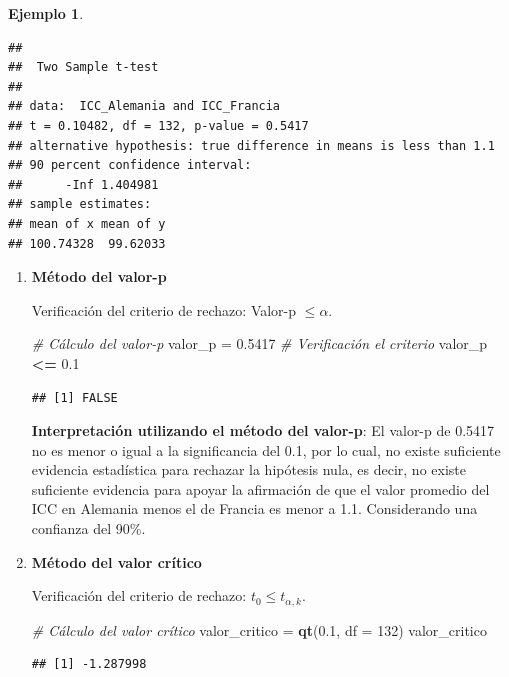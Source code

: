 \documentclass[
  11pt,
]{book}
\newenvironment{Shaded}{\begin{snugshade}}{\end{snugshade}}
\newcommand{\AttributeTok}[1]{\textcolor[rgb]{0.13,0.29,0.53}{#1}}
\newcommand{\CommentTok}[1]{\textcolor[rgb]{0.56,0.35,0.01}{\textit{#1}}}
\newcommand{\DecValTok}[1]{\textcolor[rgb]{0.00,0.00,0.81}{#1}}
\newcommand{\FloatTok}[1]{\textcolor[rgb]{0.00,0.00,0.81}{#1}}
\newcommand{\FunctionTok}[1]{\textcolor[rgb]{0.13,0.29,0.53}{\textbf{#1}}}
\newcommand{\NormalTok}[1]{#1}
\newcommand{\OtherTok}[1]{\textcolor[rgb]{0.56,0.35,0.01}{#1}}
\newcommand{\SpecialCharTok}[1]{\textcolor[rgb]{0.81,0.36,0.00}{\textbf{#1}}}
\theoremstyle{definition}
\theoremstyle{definition}
\newtheorem{example}{Ejemplo}[chapter]
\theoremstyle{definition}
\theoremstyle{definition}
\theoremstyle{remark}
\begin{document}
\begin{example}
\begin{verbatim}
## 
##  Two Sample t-test
## 
## data:  ICC_Alemania and ICC_Francia
## t = 0.10482, df = 132, p-value = 0.5417
## alternative hypothesis: true difference in means is less than 1.1
## 90 percent confidence interval:
##      -Inf 1.404981
## sample estimates:
## mean of x mean of y 
## 100.74328  99.62033
\end{verbatim}

\begin{enumerate}
\def\labelenumi{\arabic{enumi}.}
\item
  \textbf{Método del valor-p}

  Verificación del criterio de rechazo: Valor-p \(\leq \alpha\).

\begin{Shaded}
\begin{Highlighting}[]
\CommentTok{\# Cálculo del valor{-}p}
\NormalTok{valor\_p }\OtherTok{=} \FloatTok{0.5417}
\CommentTok{\# Verificación el criterio}
\NormalTok{valor\_p }\SpecialCharTok{\textless{}=} \FloatTok{0.1}
\end{Highlighting}
\end{Shaded}

\begin{verbatim}
## [1] FALSE
\end{verbatim}

  \textbf{Interpretación utilizando el método del valor-p}: El valor-p de 0.5417 no es menor o igual a la significancia del 0.1, por lo cual, no existe suficiente evidencia estadística para rechazar la hipótesis nula, es decir, no existe suficiente evidencia para apoyar la afirmación de que el valor promedio del ICC en Alemania menos el de Francia es menor a 1.1. Considerando una confianza del 90\%.
\item
  \textbf{Método del valor crítico}

  Verificación del criterio de rechazo: \(t_0 \leq t_{\alpha,k}\).

\begin{Shaded}
\begin{Highlighting}[]
\CommentTok{\# Cálculo del valor crítico}
\NormalTok{valor\_critico }\OtherTok{=} \FunctionTok{qt}\NormalTok{(}\FloatTok{0.1}\NormalTok{, }\AttributeTok{df =} \DecValTok{132}\NormalTok{)}
\NormalTok{valor\_critico}
\end{Highlighting}
\end{Shaded}

\begin{verbatim}
## [1] -1.287998
\end{verbatim}


\end{enumerate}
\end{example}
\end{document}
